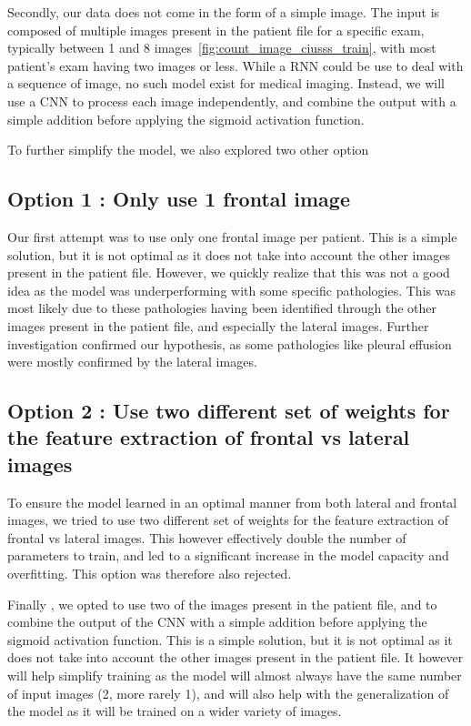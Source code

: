 \documentclass[11pt]{article}
\begin{document}
    Secondly, our data does not come in the form of a simple image. The input is composed of multiple images present 
    in the patient file for a specific exam, typically between 1 and 8 images~\ref{fig:count_image_ciusss_train}, with most patient's exam having two images or less. While a RNN could be use to deal
    with a sequence of image, no such model exist for medical imaging. Instead, we will use a CNN to process each image independently, and combine the output with a simple addition before applying the sigmoid activation function.

    To further simplify the model, we also explored two other option





    \subsection{Option 1 : Only use 1 frontal image}
        Our first attempt was to use only one frontal image per patient. This is a simple solution, but it is not optimal as it does not take into account the other images present in the patient file.
        However, we quickly realize that this was not a good idea as the model was underperforming with some specific pathologies. This was most
        likely due to these pathologies having been identified through the other images present in the patient file, and especially the lateral images.
        Further investigation confirmed our hypothesis, as some pathologies like pleural effusion were mostly confirmed by the lateral images.

    \subsection{Option 2 : Use two different set of weights for the feature extraction of frontal vs lateral images}

        To ensure the model learned in an optimal manner from both lateral and frontal images, we tried to use two different set of weights for the feature extraction of frontal vs lateral images. This however
        effectively double the number of parameters to train, and led to a significant increase in the model capacity and overfitting. This option was therefore also rejected.


    Finally , we opted to use two of the images present in the patient file, and to combine the output of the CNN with a simple addition before applying the sigmoid activation function. This is a simple solution, but it is not optimal as it does not take into account the other images present in the patient file.
    It however will help simplify training as the model will almost always have the same number of input images (2, more rarely 1), and will also help with the generalization of the model as it will be trained on a wider variety of images.
\end{document}
